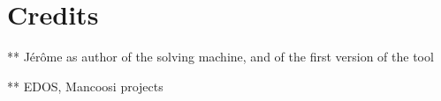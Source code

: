 \section{Credits}
\label{sec:credits}

** Jérôme as author of the solving machine, and of the first version
of the tool

** EDOS, Mancoosi projects 

